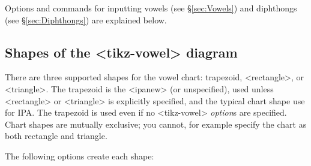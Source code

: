 \documentclass{article}
\newcommand{\pkg}[1]{\texttt{#1}}
\def\texttt#1{<#1>}%
\begin{document}
\medskip

Options and commands for inputting vowels (see \S \ref{sec:Vowels}) and diphthongs (see \S \ref{sec:Diphthongs}) are explained below.

\subsection{Shapes of the \pkg{tikz-vowel} diagram}
\label{sec:Shapes of the tikz-vowel diagram}

There are three supported shapes for the vowel chart: trapezoid, \texttt{rectangle}, or \texttt{triangle}.  The  trapezoid is the \texttt{ipanew} (or unspecified), used unless \texttt{rectangle} or \texttt{triangle} is explicitly specified, and the typical chart shape use for IPA.  The trapezoid is used even if no \texttt{tikz-vowel} \textit{option}s are specified.  Chart shapes are mutually exclusive; you cannot, for example specify the chart as both rectangle and triangle.

\bigskip
\noindent
The following options create each shape:
\end{document}
